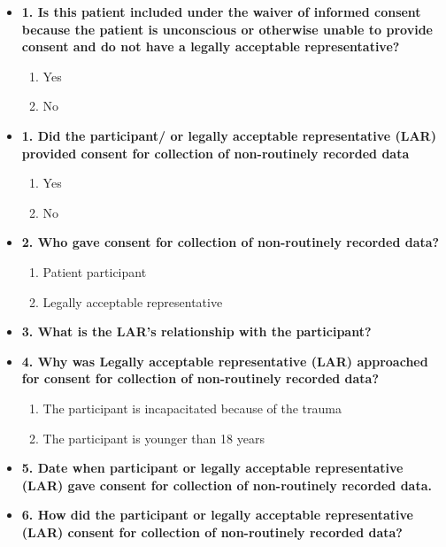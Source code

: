 \documentclass[
]{scrartcl}
\providecommand{\tightlist}{%
  \setlength{\itemsep}{0pt}\setlength{\parskip}{0pt}}\usepackage{longtable,booktabs,array}
\begin{document}
\begin{itemize}
\item
  \textbf{1. Is this patient included under the waiver of informed
  consent because the patient is unconscious or otherwise unable to
  provide consent and do not have a legally acceptable representative?}

  \begin{enumerate}
  \def\labelenumi{\arabic{enumi}.}
  \tightlist
  \item
    Yes
  \item
    No
  \end{enumerate}
\item
  \textbf{1. Did the participant/ or legally acceptable representative
  (LAR) provided consent for collection of non-routinely recorded data}

  \begin{enumerate}
  \def\labelenumi{\arabic{enumi}.}
  \tightlist
  \item
    Yes
  \item
    No
  \end{enumerate}
\item
  \textbf{2. Who gave consent for collection of non-routinely recorded
  data?}

  \begin{enumerate}
  \def\labelenumi{\arabic{enumi}.}
  \tightlist
  \item
    Patient participant
  \item
    Legally acceptable representative
  \end{enumerate}
\item
  \textbf{3. What is the LAR's relationship with the participant?}
\item
  \textbf{4. Why was Legally acceptable representative (LAR) approached
  for consent for collection of non-routinely recorded data?}

  \begin{enumerate}
  \def\labelenumi{\arabic{enumi}.}
  \tightlist
  \item
    The participant is incapacitated because of the trauma
  \item
    The participant is younger than 18 years
  \end{enumerate}
\item
  \textbf{5. Date when participant or legally acceptable representative
  (LAR) gave consent for collection of non-routinely recorded data.}
\item
  \textbf{6. How did the participant or legally acceptable
  representative (LAR) consent for collection of non-routinely recorded
  data?}


\end{itemize}
\end{document}
